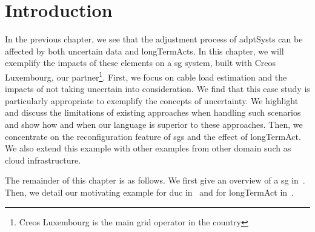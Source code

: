 \section{Introduction}

In the previous chapter, we see that the adjustment process of \glspl{adptSyst} can be affected by both uncertain data and \glspl{longTermAct}.
In this chapter, we will exemplify the impacts of these elements on a \gls{sg} system, built with Creos Luxembourg, our partner\footnote{Creos Luxembourg is the main grid operator in the country}.
First, we focus on cable load estimation and the impacts of not taking uncertain into consideration. 
We find that this case study is particularly appropriate to exemplify the concepts of uncertainty. 
We highlight and discuss the limitations of existing approaches when handling such scenarios and show how and when our language is superior to these approaches.
Then, we concentrate on the reconfiguration feature of \glspl{sg} and the effect of \gls{longTermAct}.
We also extend this example with other examples from other domain such as cloud infrastructure.

The remainder of this chapter is as follows.
We first give an overview of a \gls{sg} in~.
Then, we detail our motivating example for \gls{duc} in~ and for \gls{longTermAct} in~.

